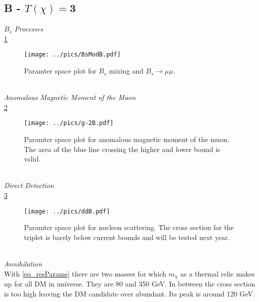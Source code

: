 \subsection{B - $T(\chi)=\boldsymbol{3}$}
\textit{$B_s$ Processes}\\
\noindent \ref{pic_BsResB}
\begin{figure}[t]
 \texttt{[image: ../pics/BsModB.pdf]}
 \caption{Paramter space plot for $B_s$ mixing and $B_s\rightarrow \mu\mu$.}
 \label{pic_BsResB}
\end{figure}
\\ \textit{Anomalous Magnetic Moment of the Muon}\\
\noindent \ref{pic_g-2B}
\begin{figure}[t]
 \texttt{[image: ../pics/g-2B.pdf]}
 \caption{Paramter space plot for anomalous magnetic moment of the muon. The area of the blue line crossing the higher and lower bound is valid.}
 \label{pic_g-2B}
\end{figure}
\\ \textit{Direct Detection} \\
\noindent \ref{pic_ddB}
\begin{figure}[t]
 \texttt{[image: ../pics/ddB.pdf]}
 \caption{Paramter space plot for nucleon scattering. The cross section for the triplet is barely below current bounds and will be tested next year.}
 \label{pic_ddB}
\end{figure}
\\ \textit{Annihilation}\\
With \eqref{eq_resParams} there are two masses for which $m_\chi$ as a thermal relic makes up for all DM in universe. They are 80 and 350 GeV. In
between the cross section is too high leaving the DM candidate over abundant. Its peak is around 120 GeV.